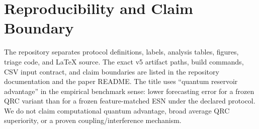 \documentclass[conference,a4paper]{IEEEtran}
\begin{document}
\section*{Reproducibility and Claim Boundary}
The repository separates protocol definitions, labels, analysis tables, figures, triage code, and LaTeX source. The exact v5 artifact paths, build commands, CSV input contract, and claim boundaries are listed in the repository documentation and the paper README. The title uses ``quantum reservoir advantage'' in the empirical benchmark sense: lower forecasting error for a frozen QRC variant than for a frozen feature-matched ESN under the declared protocol. We do not claim computational quantum advantage, broad average QRC superiority, or a proven coupling/interference mechanism.



\end{document}
